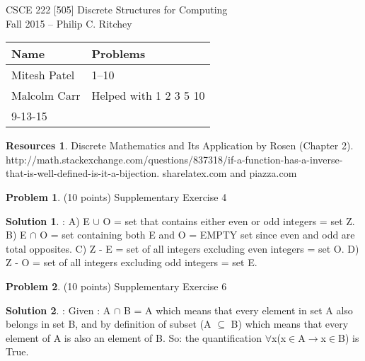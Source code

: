 \documentclass{article}
\theoremstyle{definition}
\newtheorem{problem}{Problem}
\newtheorem*{solution}{Solution}
\newtheorem*{resources}{Resources}
\newcommand{\names}[5]{
\begin{tabular}{|ll|}
\hline
\textbf{Name} & \textbf{Problems}\\
\hline
#1 & 1--10\\
#2 & #3\\
#4 & #5\\
\hline
\end{tabular}}
\begin{document}
\begin{center}
{\large
CSCE 222 [505] Discrete Structures for Computing\\[.5ex]
Fall 2015 -- Philip C. Ritchey\\}
\end{center}



\names{Mitesh Patel}{Malcolm Carr}{Helped with 1 2 3 5 10}{9-13-15}{}

\begin{resources} Discrete Mathematics and Its Application by Rosen (Chapter 2). http://math.stackexchange.com/questions/837318/if-a-function-has-a-inverse-that-is-well-defined-is-it-a-bijection. sharelatex.com and piazza.com %
\end{resources}

\bigskip

\begin{problem} (10 points) 
Supplementary Exercise 4
\end{problem}
\begin{solution}:
\newline
A) E $\cup$ O = set that contains either even or odd integers = set Z.
\newline
B) E $\cap$ O = set containing both E and O = EMPTY set since even and odd are total opposites.
\newline
C) Z - E = set of all integers excluding even integers = set O.
\newline
D) Z - O = set of all integers excluding odd integers = set E.
\end{solution}

\newpage

\begin{problem} (10 points) 
Supplementary Exercise 6
\end{problem}
\begin{solution}:
\newline
Given : A $\cap$ B = A which means that every element in set A also belongs in set B, and by definition of subset (A $\subseteq$ B)  which means that every element of A is also an element of B.\newline 
So: the quantification $\forall$x(x$\in$A$\to$x$\in$B) is True.
\end{solution}

\newpage
\end{document}
